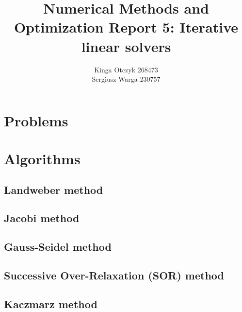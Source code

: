 \documentclass[a4paper]{article}
\title{Numerical Methods and Optimization Report 5:
Iterative linear solvers}
\author{Kinga Otczyk 268473\\Sergiusz Warga 230757}
\begin{document}
\maketitle
\tableofcontents
\pagebreak

\section{Problems}




\clearpage

\section{Algorithms}
\label{sec:algorithms}

\subsection{Landweber method}%
\label{alg:landweber}


\subsection{Jacobi method}%
\label{alg:jacobi}


\subsection{Gauss-Seidel method}%
\label{alg:gauss-seidel}


\subsection{Successive Over-Relaxation (SOR) method}%
\label{slg:sor}


\subsection{Kaczmarz method}%
\label{slg:kaczmarz}


\clearpage

\nocite{Meyer, GoluVanl96, Zdunek}


\end{document}
